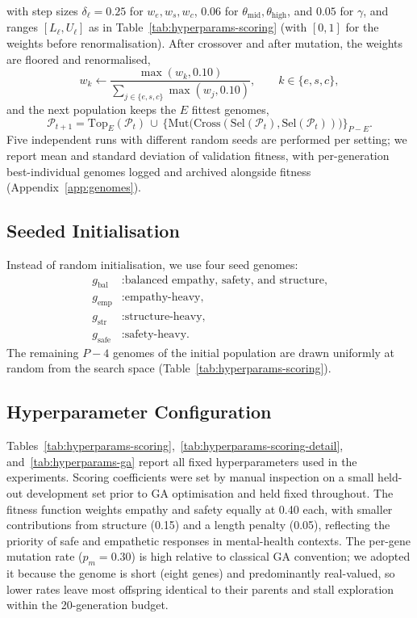 \documentclass[mathematics,article,submit,xetex,moreauthors]{Definitions/mdpi}
\begin{document}
with step sizes $\delta_\ell = 0.25$ for $w_e, w_s, w_c$, $0.06$ for
$\theta_{\mathrm{mid}}, \theta_{\mathrm{high}}$, and $0.05$ for $\gamma$, and
ranges $[L_\ell, U_\ell]$ as in Table~\ref{tab:hyperparams-scoring} (with
$[0, 1]$ for the weights before renormalisation). After crossover and after
mutation, the weights are floored and renormalised,
\begin{equation}
\label{eq:ga-normalise}
  w_k \leftarrow \frac{\max(w_k, 0.10)}{\sum_{j \in \{e, s, c\}} \max(w_j, 0.10)},
  \qquad k \in \{e, s, c\},
\end{equation}
and the next population keeps the $E$ fittest genomes,
\begin{equation}
\label{eq:ga-update}
  \mathcal{P}_{t+1} = \mathrm{Top}_E(\mathcal{P}_t) \,\cup\,
  \bigl\{\mathrm{Mut}\bigl(\mathrm{Cross}(\mathrm{Sel}(\mathcal{P}_t), \mathrm{Sel}(\mathcal{P}_t))\bigr)\bigr\}_{P - E}.
\end{equation}
Five independent runs with different random seeds are performed per setting;
we report mean and standard deviation of validation fitness, with
per-generation best-individual genomes logged and archived alongside
fitness (Appendix~\ref{app:genomes}).

\subsection{Seeded Initialisation}

Instead of random initialisation, we use four seed genomes:
\begin{align}
  g_{\mathrm{bal}}  &: \text{balanced empathy, safety, and structure,} \\
  g_{\mathrm{emp}}  &: \text{empathy-heavy,} \\
  g_{\mathrm{str}}  &: \text{structure-heavy,} \\
  g_{\mathrm{safe}} &: \text{safety-heavy.}
\end{align}
The remaining $P - 4$ genomes of the initial population are drawn uniformly
at random from the search space (Table~\ref{tab:hyperparams-scoring}).

\subsection{Hyperparameter Configuration}
\label{sec:hyperparams}

Tables~\ref{tab:hyperparams-scoring},~\ref{tab:hyperparams-scoring-detail},
and~\ref{tab:hyperparams-ga} report all
fixed hyperparameters used in the experiments. Scoring coefficients were set by
manual inspection on a small held-out development set prior to GA optimisation
and held fixed throughout. The fitness function weights empathy and safety
equally at 0.40 each, with smaller contributions from structure (0.15) and a
length penalty (0.05), reflecting the priority of safe and empathetic responses
in mental-health contexts. The per-gene mutation rate ($p_m = 0.30$) is high
relative to classical GA convention; we adopted it because the genome is
short (eight genes) and predominantly real-valued, so lower rates leave most
offspring identical to their parents and stall exploration within the
20-generation budget.
\end{document}
